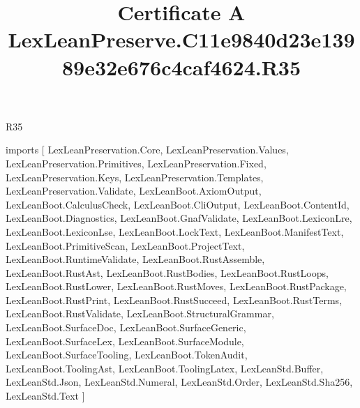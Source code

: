 \begin{lexlean}{R35}
\title{Certificate A LexLeanPreserve.C11e9840d23e13989e32e676c4caf4624.R35}
\begin{coremodule}
imports [
  LexLeanPreservation.Core,
  LexLeanPreservation.Values,
  LexLeanPreservation.Primitives,
  LexLeanPreservation.Fixed,
  LexLeanPreservation.Keys,
  LexLeanPreservation.Templates,
  LexLeanPreservation.Validate,
  LexLeanBoot.AxiomOutput,
  LexLeanBoot.CalculusCheck,
  LexLeanBoot.CliOutput,
  LexLeanBoot.ContentId,
  LexLeanBoot.Diagnostics,
  LexLeanBoot.GnafValidate,
  LexLeanBoot.LexiconLre,
  LexLeanBoot.LexiconLse,
  LexLeanBoot.LockText,
  LexLeanBoot.ManifestText,
  LexLeanBoot.PrimitiveScan,
  LexLeanBoot.ProjectText,
  LexLeanBoot.RuntimeValidate,
  LexLeanBoot.RustAssemble,
  LexLeanBoot.RustAst,
  LexLeanBoot.RustBodies,
  LexLeanBoot.RustLoops,
  LexLeanBoot.RustLower,
  LexLeanBoot.RustMoves,
  LexLeanBoot.RustPackage,
  LexLeanBoot.RustPrint,
  LexLeanBoot.RustSucceed,
  LexLeanBoot.RustTerms,
  LexLeanBoot.RustValidate,
  LexLeanBoot.StructuralGrammar,
  LexLeanBoot.SurfaceDoc,
  LexLeanBoot.SurfaceGeneric,
  LexLeanBoot.SurfaceLex,
  LexLeanBoot.SurfaceModule,
  LexLeanBoot.SurfaceTooling,
  LexLeanBoot.TokenAudit,
  LexLeanBoot.ToolingAst,
  LexLeanBoot.ToolingLatex,
  LexLeanStd.Buffer,
  LexLeanStd.Json,
  LexLeanStd.Numeral,
  LexLeanStd.Order,
  LexLeanStd.Sha256,
  LexLeanStd.Text
]


\end{coremodule}
\end{lexlean}
